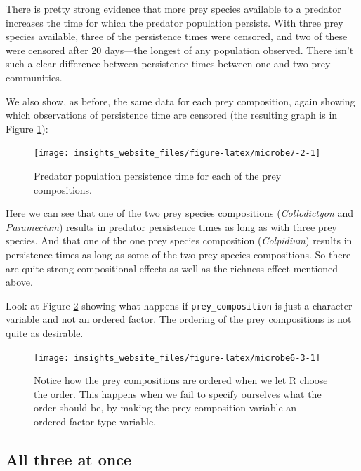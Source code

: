 \documentclass[]{book}
\makeatletter
\newenvironment{kframe}{%
\medskip{}
\setlength{\fboxsep}{.8em}
 \def\at@end@of@kframe{}%
 \ifinner\ifhmode%
  \def\at@end@of@kframe{\end{minipage}}%
  \begin{minipage}{\columnwidth}%
 \fi\fi%
 \def\FrameCommand##1{\hskip\@totalleftmargin \hskip-\fboxsep
 \colorbox{shadecolor}{##1}\hskip-\fboxsep
     \hskip-\linewidth \hskip-\@totalleftmargin \hskip\columnwidth}%
 \MakeFramed {\advance\hsize-\width
   \@totalleftmargin\z@ \linewidth\hsize
   \@setminipage}}%
 {\par\unskip\endMakeFramed%
 \at@end@of@kframe}
\newenvironment{rmdblock}[1]
  {
  \begin{itemize}
  \renewcommand{\labelitemi}{
    \raisebox{-.7\height}[0pt][0pt]{
      {\setkeys{Gin}{width=3em,keepaspectratio}\texttt{[image: images/\#1]}}
    }
  }
  \setlength{\fboxsep}{1em}
  \begin{kframe}
  \item
  }
  {
  \end{kframe}
  \end{itemize}
  }
\newenvironment{efficiency}
  {\begin{rmdblock}{efficiency}}
  {\end{rmdblock}}
\makeatother
\begin{document}
There is pretty strong evidence that more prey species available to a predator increases the time for which the predator population persists. With three prey species available, three of the persistence times were censored, and two of these were censored after 20 days---the longest of any population observed. There isn't such a clear difference between persistence times between one and two prey communities.

We also show, as before, the same data for each prey composition, again showing which observations of persistence time are censored (the resulting graph is in Figure \ref{fig:microbe7-2}):

\begin{figure}

{\centering \texttt{[image: insights\_website\_files/figure-latex/microbe7-2-1]} 

}

\caption{Predator population persistence time for each of the prey compositions.}\label{fig:microbe7-2}
\end{figure}

Here we can see that one of the two prey species compositions (\emph{Collodictyon} and \emph{Paramecium}) results in predator persistence times as long as with three prey species. And that one of the one prey species composition (\emph{Colpidium}) results in persistence times as long as some of the two prey species compositions. So there are quite strong compositional effects as well as the richness effect mentioned above.

\begin{efficiency}
Look at Figure \ref{fig:microbe6-3} showing what happens if
\texttt{prey\_composition} is just a character variable and not an
ordered factor. The ordering of the prey compositions is not quite as
desirable.
\end{efficiency}

\begin{figure}

{\centering \texttt{[image: insights\_website\_files/figure-latex/microbe6-3-1]} 

}

\caption{Notice how the prey compositions are ordered when we let R choose the order. This happens when we fail to specify ourselves what the order should be, by making the prey composition variable an ordered factor type variable.}\label{fig:microbe6-3}
\end{figure}

\hypertarget{all-three-at-once}{%
\subsection{All three at once}\label{all-three-at-once}}
\end{document}
